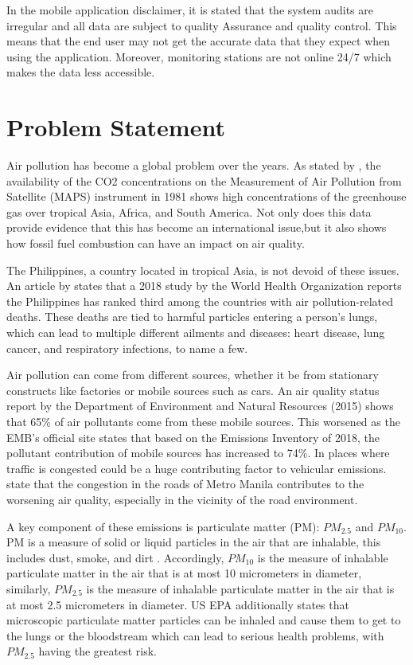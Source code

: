 In the mobile application disclaimer, it is stated that the system audits are irregular and all data are subject to quality Assurance and quality control. This means that the end user may not get the accurate data that they expect when using the application. Moreover, monitoring stations are not online 24/7 which makes the data less accessible.


\section{Problem Statement}
	Air pollution has become a global problem over the years. As stated by \cite{Akimoto2004}, the availability of the CO2 concentrations on the Measurement of Air Pollution from Satellite (MAPS) instrument in 1981 shows high concentrations of the greenhouse gas over tropical Asia, Africa, and South America. Not only does this data provide evidence that this has become an international issue,but it also shows how fossil fuel combustion can have an impact on air quality. 

The Philippines, a country located in tropical Asia, is not devoid of these issues. An article by \cite{abano_2019} states that a 2018 study by the World Health Organization reports the Philippines has ranked third among the countries with air pollution-related deaths. These deaths are tied to harmful particles entering a person’s lungs, which can lead to multiple different ailments and diseases: heart disease, lung cancer, and respiratory infections, to name a few.

Air pollution can come from different sources, whether it be from stationary constructs like factories or mobile sources such as cars. \cite{EMB_2015}  An air quality status report by the Department of Environment and Natural Resources (2015) shows that 65\% of air pollutants come from these mobile sources. This worsened as the EMB’s official site \cite{EMB_2018} states that based on the Emissions Inventory of 2018, the pollutant contribution of mobile sources has increased to  74\%. In places where traffic is congested could be a huge contributing factor to vehicular emissions. \cite{vergel_yai2000} state that the congestion in the roads of Metro Manila contributes to the worsening air quality, especially in the vicinity of the road environment.

A key component of these emissions is particulate matter (PM): $PM_{2.5}$ and $PM_{10}$. PM is a measure of solid or liquid particles in the air that are inhalable, this includes dust, smoke, and dirt \cite{EPA_2022}. Accordingly, $PM_{10}$ is the measure of inhalable particulate matter in the air that is at most 10 micrometers in diameter, similarly, $PM_{2.5}$ is the measure of inhalable particulate matter in the air that is at most 2.5 micrometers in diameter. US EPA \citeyear{EPA_2022} additionally states that microscopic particulate matter particles can be inhaled and cause them to get to the lungs or the bloodstream which can lead to serious health problems, with $PM_{2.5}$ having the greatest risk.

